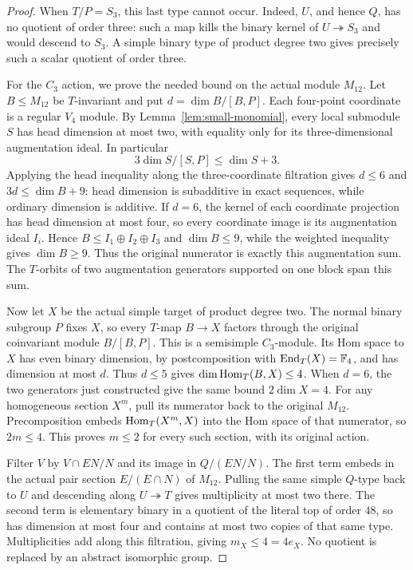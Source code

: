 \begin{proof}
When $T/P=S_3$, this last type cannot occur. Indeed, $U$, and hence
$Q$, has no quotient of order three: such a map kills the binary
kernel of $U\twoheadrightarrow S_3$ and would descend to $S_3$.
A simple binary type of product degree two gives precisely such
a scalar quotient of order three.

For the $C_3$ action, we prove the needed bound on the actual module
$M_{12}$. Let $B\leq M_{12}$ be $T$-invariant and put
$d=\dim B/[B,P]$. Each four-point coordinate is a regular $V_4$
module. By Lemma~\ref{lem:small-monomial}, every local submodule $S$
has head dimension at most two, with equality only for its
three-dimensional augmentation ideal. In particular
\[
 3\dim S/[S,P]\leq\dim S+3.
\]
Applying the head inequality along the three-coordinate filtration
gives $d\leq6$ and $3d\leq\dim B+9$: head dimension is subadditive
in exact sequences, while ordinary dimension is additive. If $d=6$,
the kernel of
each coordinate projection has head dimension at most four, so every
coordinate image is its augmentation ideal $I_i$. Hence
$B\leq I_1\oplus I_2\oplus I_3$ and $\dim B\leq9$, while the
weighted inequality gives $\dim B\geq9$. Thus the original numerator
is exactly this augmentation sum. The $T$-orbits of two augmentation
generators supported on one block span this sum.

Now let $X$ be the actual simple target of product degree two.
The normal binary subgroup $P$ fixes $X$, so every $T$-map $B\to X$
factors through the original coinvariant module $B/[B,P]$.
This is a semisimple $C_3$-module. Its Hom space to $X$ has even
binary dimension, by postcomposition with $\operatorname{End}_T(X)=\mathbb F_4$, and
has dimension at most $d$. Thus $d\leq5$ gives
$\dim\operatorname{Hom}_T(B,X)\leq4$. When $d=6$, the two generators just
constructed give the same bound $2\dim X=4$.
For any homogeneous section $X^m$, pull its numerator back to the
original $M_{12}$. Precomposition embeds
$\operatorname{Hom}_T(X^m,X)$ into the Hom space of that numerator, so $2m\leq4$.
This proves $m\leq2$ for every such section, with its original action.

Filter $V$ by $V\cap EN/N$ and its image in $Q/(EN/N)$.
The first term embeds in the actual pair section $E/(E\cap N)$
of $M_{12}$. Pulling the same simple $Q$-type back to $U$ and
descending along $U\twoheadrightarrow T$ gives multiplicity at most
two there. The second term is elementary binary in a quotient of the
literal top of order $48$, so has dimension at most four and contains
at most two copies of that same type. Multiplicities add along this
filtration, giving $m_X\leq4=4e_X$. No quotient is replaced by
an abstract isomorphic group.


\end{proof}
